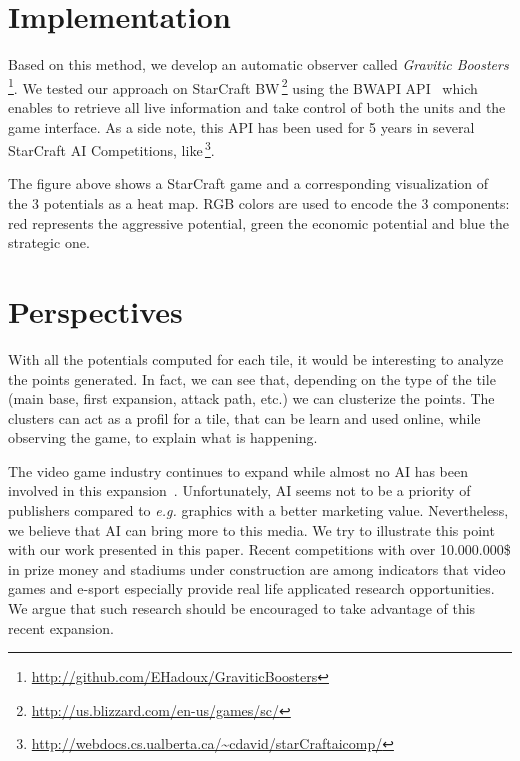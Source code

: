 \documentclass{jfsma}
\begin{document}
\section{Implementation}

Based on this method, we develop an automatic observer called \emph{Gravitic Boosters}\,\footnote{\url{http://github.com/EHadoux/GraviticBoosters}}.
We tested our approach on StarCraft BW\,\footnote{\url{http://us.blizzard.com/en-us/games/sc/}} using
the BWAPI API~\cite{bwapi} which enables to retrieve all live information and take control of both the units and the game interface.
As a side note, this API has been used for 5 years in several StarCraft AI Competitions, like\,\footnote{\url{http://webdocs.cs.ualberta.ca/~cdavid/starCraftaicomp/}}. %

The figure above shows a StarCraft game and a corresponding visualization of the 3 potentials as a heat map.
RGB colors are used to encode the 3 components: red represents the aggressive potential, green the economic potential and blue the strategic one.

\section{Perspectives}
With all the potentials computed for each tile, it would be interesting to analyze the points generated.
In fact, we can see that, depending on the type of the tile (main base, first expansion, attack path, etc.) we can clusterize the points.
The clusters can act as a profil for a tile, that can be learn and used online, while observing the game, to explain what is happening.

The video game industry continues to expand while almost no AI has been involved in this expansion~\cite{miikkulainen2007creating}.
Unfortunately, AI seems not to be a priority of publishers compared to \textit{e.g.} graphics with a better marketing value.
Nevertheless, we believe that AI can bring more to this media.
We try to illustrate this point with our work presented in this paper.
Recent competitions with over 10.000.000\$ in prize money and stadiums under construction are among indicators that video games and e-sport especially provide real life applicated research opportunities.
We argue that such research should be encouraged to take advantage of this recent expansion.



\end{document}
